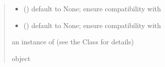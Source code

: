 \documentclass[letterpaper,10pt,english]{sphinxmanual}
\begin{document}
\begin{fulllineitems}
\begin{quote}
\begin{description}
\begin{itemize}
\item {} 
\sphinxAtStartPar
{} () \textendash{} default to None; ensure compatibility with 

\item {} 
\sphinxAtStartPar
{} () \textendash{} default to None; ensure compatibility with 

\end{itemize}

\sphinxAtStartPar
an instance of  (see the Class for details)

\sphinxAtStartPar
object

\end{description}\end{quote}

\end{fulllineitems}

\end{document}
